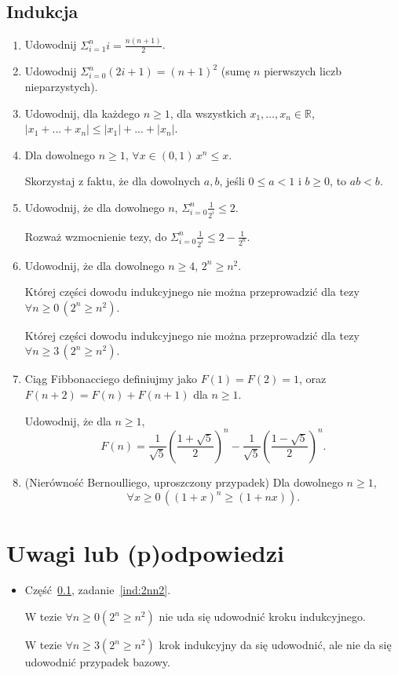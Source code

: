 \documentclass[12pt]{article}
\newcommand{\bR}{\mathbb{R}}
\begin{document}
\subsection{Indukcja}\label{ss:indukcja}
\begin{enumerate}
    \item Udowodnij $\Sigma_{i=1}^n i = \frac{n(n+1)}{2}$. 
    \item Udowodnij $\Sigma_{i=0}^n (2i+1) = (n+1)^2$
           (sumę $n$ pierwszych liczb nieparzystych).
    \item Udowodnij, dla każdego $n\geq 1$, dla wszystkich $x_1,\dots, x_n\in \bR$, $|x_1 + ... + x_n| \leq  |x_1| + ... + |x_n|$.
\item 
Dla dowolnego  $n\geq 1$, $\forall x \in (0,1)\, x^n \leq  x$.

Skorzystaj z faktu, że dla dowolnych $a,b$, jeśli $0\leq a < 1$ i $b\geq 0$, to $ab<b$.

\item 
Udowodnij, że dla dowolnego $n$, $\Sigma_{i=0}^n \frac{1}{2^i} \leq 2$.

Rozważ wzmocnienie  tezy, 
do $\Sigma_{i=0}^n \frac{1}{2^i} \leq 2-\frac{1}{2^{n}}$.

\item \label{ind:2nn2} Udowodnij, że dla dowolnego $n\geq 4$, $2^n\geq  n^2$.

Której części dowodu indukcyjnego nie można przeprowadzić 
dla tezy $\forall n\geq 0\, (2^n\geq n^2)$.

Której części dowodu indukcyjnego nie można przeprowadzić 
dla tezy $\forall n\geq 3\, (2^n\geq n^2)$.


\item Ciąg Fibbonacciego definiujmy jako 
$F(1)=F(2)=1$, oraz $F(n+2)=F(n)+F(n+1)$ dla $n\geq 1$.

Udowodnij, że dla $n\geq 1$, 
$$
F(n)=\frac{1}{\sqrt{5}}\left(\frac{1+\sqrt{5}}{2}\right)^n- 
    \frac{1}{\sqrt{5}}\left(\frac{1-\sqrt{5}}{2}\right)^n.
$$

\item 
(Nierówność Bernoulliego,  uproszczony przypadek) Dla dowolnego $n\geq 1$, 
\[
\forall x \geq 0\, ((1+x)^n \geq (1+nx)).
\]

\end{enumerate}

\section{Uwagi lub (p)odpowiedzi}


\begin{itemize}
    \item Część~\ref{ss:indukcja}, zadanie~\ref{ind:2nn2}. 
     
     W tezie $\forall n\geq 0 (2^n\geq n^2)$ nie uda się 
     udowodnić kroku indukcyjnego.
     
     W tezie $\forall n\geq 3 (2^n\geq n^2)$ krok indukcyjny da się udowodnić, ale nie da się udowodnić przypadek bazowy.
\end{itemize}



\end{document}
